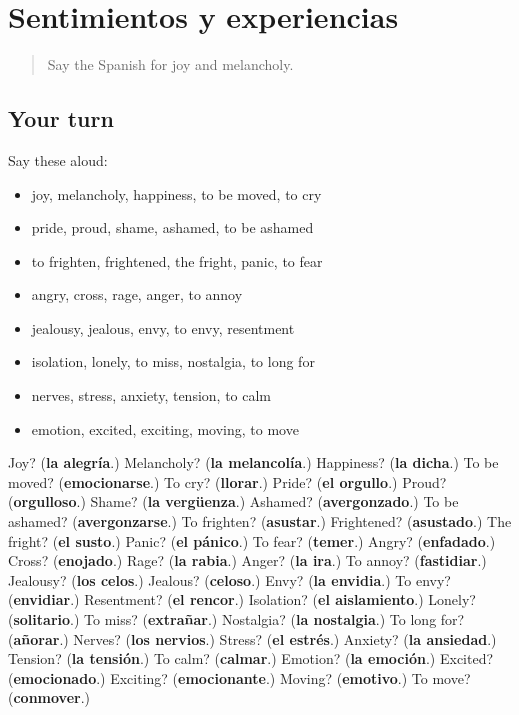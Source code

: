 \section[(dialogue)]{Sentimientos y experiencias}

\label{lesson:ES-R711-repaso-704-711}



\begin{quote}
Say the Spanish for joy and melancholy.
\end{quote}

\subsection*{Your turn}
Say these aloud:

\begin{itemize}
\raggedright
  \item joy, melancholy, happiness, to be moved, to cry
  \item pride, proud, shame, ashamed, to be ashamed
  \item to frighten, frightened, the fright, panic, to fear
  \item angry, cross, rage, anger, to annoy
  \item jealousy, jealous, envy, to envy, resentment
  \item isolation, lonely, to miss, nostalgia, to long for
  \item nerves, stress, anxiety, tension, to calm
  \item emotion, excited, exciting, moving, to move
\end{itemize}

\begin{tcolorbox}[breakable,colback=teal!4,colframe=teal!35!black,title={Before you move on}]
Joy? (\textbf{la alegría}.) Melancholy? (\textbf{la melancolía}.) Happiness? (\textbf{la dicha}.) To be moved? (\textbf{emocionarse}.) To cry? (\textbf{llorar}.) Pride? (\textbf{el orgullo}.) Proud? (\textbf{orgulloso}.) Shame? (\textbf{la vergüenza}.) Ashamed? (\textbf{avergonzado}.) To be ashamed? (\textbf{avergonzarse}.) To frighten? (\textbf{asustar}.) Frightened? (\textbf{asustado}.) The fright? (\textbf{el susto}.) Panic? (\textbf{el pánico}.) To fear? (\textbf{temer}.) Angry? (\textbf{enfadado}.) Cross? (\textbf{enojado}.) Rage? (\textbf{la rabia}.) Anger? (\textbf{la ira}.) To annoy? (\textbf{fastidiar}.) Jealousy? (\textbf{los celos}.) Jealous? (\textbf{celoso}.) Envy? (\textbf{la envidia}.) To envy? (\textbf{envidiar}.) Resentment? (\textbf{el rencor}.) Isolation? (\textbf{el aislamiento}.) Lonely? (\textbf{solitario}.) To miss? (\textbf{extrañar}.) Nostalgia? (\textbf{la nostalgia}.) To long for? (\textbf{añorar}.) Nerves? (\textbf{los nervios}.) Stress? (\textbf{el estrés}.) Anxiety? (\textbf{la ansiedad}.) Tension? (\textbf{la tensión}.) To calm? (\textbf{calmar}.) Emotion? (\textbf{la emoción}.) Excited? (\textbf{emocionado}.) Exciting? (\textbf{emocionante}.) Moving? (\textbf{emotivo}.) To move? (\textbf{conmover}.)
\end{tcolorbox}
